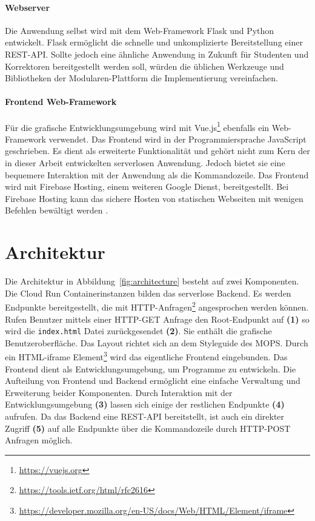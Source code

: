 \paragraph{Webserver} Die Anwendung selbst wird mit dem Web-Framework
Flask \cite{Flask}
und Python entwickelt. Flask ermöglicht die schnelle und
unkomplizierte Bereitstellung einer REST-API. Sollte jedoch eine ähnliche Anwendung in Zukunft
für Studenten und Korrektoren bereitgestellt werden soll, würden die üblichen Werkzeuge und
Bibliotheken der Modularen-Plattform die Implementierung vereinfachen.

\paragraph{Frontend Web-Framework} Für die grafische Entwicklungsumgebung
wird mit Vue.js\footnote{\url{https://vuejs.org}} ebenfalls ein Web-Framework verwendet.
Das Frontend wird in der Programmiersprache JavaScript geschrieben. Es dient als
erweiterte Funktionalität und gehört nicht zum Kern der in dieser Arbeit entwickelten
serverlosen Anwendung. Jedoch bietet sie eine bequemere Interaktion mit der Anwendung als
die Kommandozeile. Das Frontend wird mit
Firebase Hosting, einem weiteren Google Dienst,
bereitgestellt. Bei Firebase Hosting kann das sichere Hosten von statischen Webseiten
mit wenigen Befehlen bewältigt werden \cite{FirebaseHosting}.

\section{Architektur}
Die Architektur in Abbildung~\ref{fig:architecture} besteht auf zwei
Komponenten.
Die Cloud Run Containerinstanzen bilden das serverlose Backend.
Es werden Endpunkte bereitgestellt, die mit
HTTP-Anfragen\footnote{\url{https://tools.ietf.org/html/rfc2616}}
angesprochen werden können. Rufen Benutzer
mittels einer HTTP-GET Anfrage den
Root-Endpunkt auf \textbf{(1)} so wird
die \texttt{index.html} Datei zurückgesendet \textbf{(2)}.
Sie enthält die grafische Benutzeroberfläche. Das Layout richtet
sich an dem Styleguide des MOPS. Durch ein
HTML-iframe Element\footnote{\url{https://developer.mozilla.org/en-US/docs/Web/HTML/Element/iframe}}
wird das eigentliche Frontend eingebunden. Das Frontend dient als Entwicklungsumgebung, um Programme
zu entwickeln. Die Aufteilung von Frontend und Backend
ermöglicht eine einfache Verwaltung und Erweiterung beider Komponenten.
Durch Interaktion mit der Entwicklungsumgebung \textbf{(3)} lassen sich einige
der restlichen Endpunkte \textbf{(4)} aufrufen. 
Da das Backend eine REST-API bereitstellt, ist auch ein direkter Zugriff \textbf{(5)} auf alle 
Endpunkte über die Kommandozeile durch HTTP-POST Anfragen möglich.

